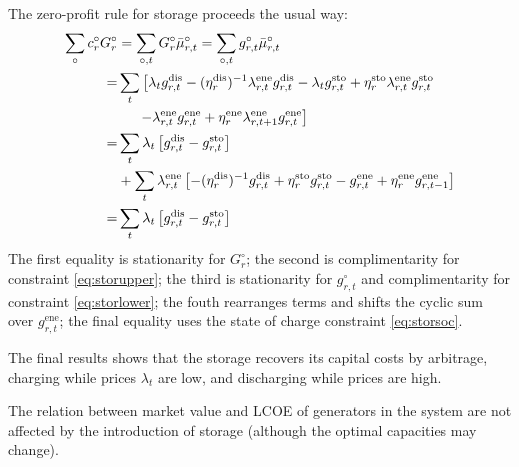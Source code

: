 \documentclass[final,3p,times]{elsarticle}
\def\l{\lambda} \def\K{\kappa} \def\m{\mu} \def\G{\Gamma} \def\d{\partial}
\begin{document}
The zero-profit rule for storage proceeds the usual way:
\begin{align}
  \sum_\circ c^\circ_r G^\circ_r & =  \sum_{\circ,t} G^\circ_r\bar{\m}^\circ_{r,t}  =   \sum_{\circ,t} g^\circ_{r,t}\bar{\m}^\circ_{r,t} \nonumber                                                                                                                         \\
  =                              & \sum_t \left[ \l_t g^{\textrm{dis}}_{r,t} -(\eta^{\textrm{dis}}_r)^{-1} \l^{\textrm{ene}}_{r,t}  g^{\textrm{dis}}_{r,t}
  -\l_t g^{\textrm{sto}}_{r,t} + \eta^{\textrm{sto}}_r \l^{\textrm{ene}}_{r,t} g^{\textrm{sto}}_{r,t} \right.\nonumber                                                                                                                                                     \\
                                 & \left. \hspace{.5cm}-\l^{\textrm{ene}}_{r,t}g^{\textrm{ene}}_{r,t} + \eta^{\textrm{ene}}_r \l^{\textrm{ene}}_{r,t+1}g^{\textrm{ene}}_{r,t} \right] \nonumber                                                                            \\
  =                              & \sum_t \l_t \left[ g^{\textrm{dis}}_{r,t} - g^{\textrm{sto}}_{r,t}  \right] \nonumber                                                                                                                                                   \\
                                 & + \sum_t  \l^{\textrm{ene}}_{r,t} \left[ -(\eta^{\textrm{dis}}_r)^{-1} g^{\textrm{dis}}_{r,t}+ \eta^{\textrm{sto}}_r  g^{\textrm{sto}}_{r,t} -g^{\textrm{ene}}_{r,t} + \eta^{\textrm{ene}}_r g^{\textrm{ene}}_{r,t-1} \right] \nonumber \\
  =                              & \sum_t \l_t \left[ g^{\textrm{dis}}_{r,t} - g^{\textrm{sto}}_{r,t}  \right]
\end{align}
The first equality is stationarity for $G^\circ_r$; the second is
complimentarity for constraint \eqref{eq:storupper}; the third is stationarity
for $g^\circ_{r,t}$ and complimentarity for constraint \eqref{eq:storlower}; the
fouth rearranges terms and shifts the cyclic sum over $g^{\textrm{ene}}_{r,t}$;
the final equality uses the state of charge constraint \eqref{eq:storsoc}.

The final results shows that the storage recovers its capital costs by
arbitrage, charging while prices $\l_t$ are low, and discharging while prices
are high.

The relation between market value and LCOE of generators in the system are not
affected by the introduction of storage (although the optimal capacities may
change).



\end{document}
